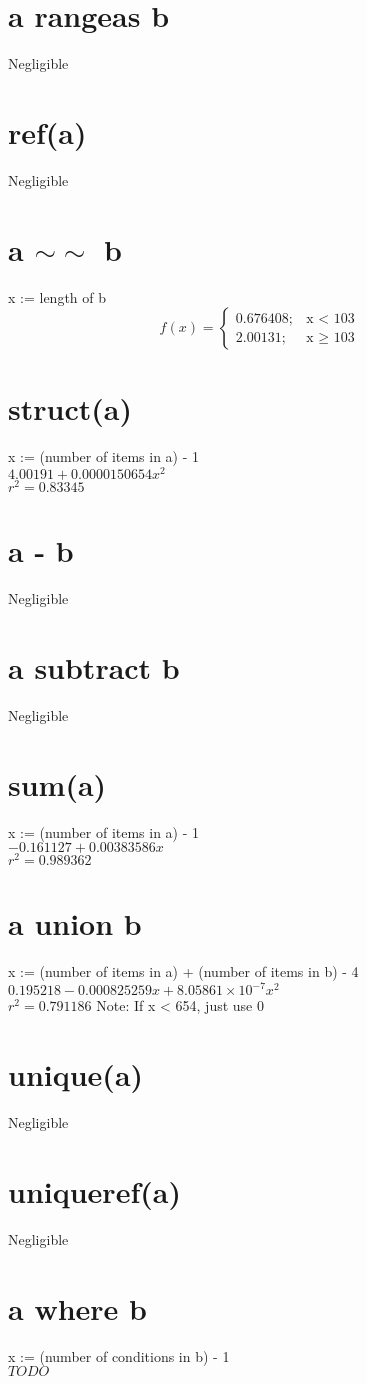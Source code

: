 \documentclass[12pt]{article}
\begin{document}
	\section{a rangeas b}
	Negligible
	
	\section{ref(a)}
	Negligible
	
	\section{a $\sim\sim$ b}
	x := length of b
	\begin{displaymath}
		f(x) = \left\{
			\begin{array}{lr}
				0.676408; & \text{x $<$ 103}\\
				2.00131; & \text{x $\geq$ 103}
			\end{array}
		\right.
	\end{displaymath}
	
	\section{struct(a)}
	x := (number of items in a) - 1\\
	$4.00191 + 0.0000150654 x^2$\\
	$r^2 = 0.83345$
	
	\section{a - b}
	Negligible
	
	\section{a subtract b}
	Negligible
	
	\section{sum(a)}
	x := (number of items in a) - 1\\
	$-0.161127 + 0.00383586 x$\\
	$r^2 = 0.989362$
	
	\section{a union b}
	x := (number of items in a) + (number of items in b) - 4\\
	$0.195218 - 0.000825259 x + 8.05861 \times 10^{-7} x^2$\\
	$r^2 = 0.791186$
	Note: If x < 654, just use 0
	
	\section{unique(a)}
	Negligible
	
	\section{uniqueref(a)}
	Negligible
	
	\section{a where b}
	x := (number of conditions in b) - 1\\
	$TODO$
\end{document}
